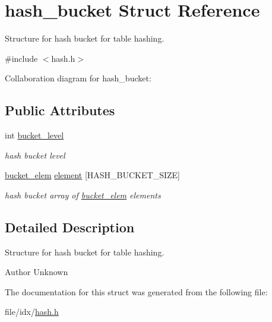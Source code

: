 \hypertarget{structhash__bucket}{}\section{hash\+\_\+bucket Struct Reference}
\label{structhash__bucket}


Structure for hash bucket for table hashing.  




{\ttfamily \#include $<$hash.\+h$>$}



Collaboration diagram for hash\+\_\+bucket\+:
\subsection*{Public Attributes}
\begin{DoxyCompactItemize}
\item 
int \hyperlink{structhash__bucket_a22e1e793b45ac131d377ae2113bf3332}{bucket\+\_\+level}\hypertarget{structhash__bucket_a22e1e793b45ac131d377ae2113bf3332}{}\label{structhash__bucket_a22e1e793b45ac131d377ae2113bf3332}

\begin{DoxyCompactList}\small\item\em hash bucket level \end{DoxyCompactList}\item 
\hyperlink{structbucket__elem}{bucket\+\_\+elem} \hyperlink{structhash__bucket_a0d731c8704ee8499e99165f094efb61f}{element} \mbox{[}H\+A\+S\+H\+\_\+\+B\+U\+C\+K\+E\+T\+\_\+\+S\+I\+ZE\mbox{]}\hypertarget{structhash__bucket_a0d731c8704ee8499e99165f094efb61f}{}\label{structhash__bucket_a0d731c8704ee8499e99165f094efb61f}

\begin{DoxyCompactList}\small\item\em hash bucket array of \hyperlink{structbucket__elem}{bucket\+\_\+elem} elements \end{DoxyCompactList}\end{DoxyCompactItemize}


\subsection{Detailed Description}
Structure for hash bucket for table hashing. 

\begin{DoxyAuthor}{Author}
Unknown 
\end{DoxyAuthor}


The documentation for this struct was generated from the following file\+:\begin{DoxyCompactItemize}
\item 
file/idx/\hyperlink{hash_8h}{hash.\+h}\end{DoxyCompactItemize}
